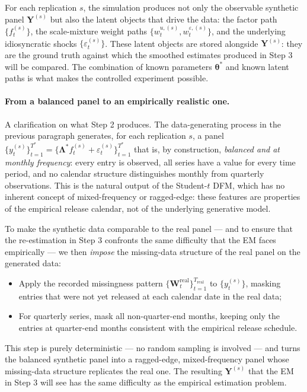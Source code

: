 \documentclass[11pt, a4paper, oneside]{article}
\newcommand{\mY}{\mathbf{Y}}
\newcommand{\mL}{\boldsymbol{\Lambda}}
\newcommand{\btheta}{\boldsymbol{\theta}}
\begin{document}
For each replication $s$, the simulation produces not only the
observable synthetic panel $\mY^{(s)}$ but also the latent objects
that drive the data: the factor path $\{f_t^{(s)}\}$, the
scale-mixture weight paths $\{w_t^{u,(s)}, w_t^{\varepsilon, (s)}\}$,
and the underlying idiosyncratic shocks
$\{\varepsilon_t^{(s)}\}$. These latent objects are stored alongside
$\mY^{(s)}$: they are the ground truth against which the smoothed
estimates produced in Step 3 will be compared. The combination of
known parameters $\btheta^*$ and known latent paths is what makes the
controlled experiment possible.

\paragraph{From a balanced panel to an empirically realistic one.}
A clarification on what Step 2 produces. The data-generating
process in the previous paragraph generates, for each replication
$s$, a panel
$\{y_t^{(s)}\}_{t=1}^{T^*} = \{\mL^* f_t^{(s)} + \varepsilon_t^{(s)}\}_{t=1}^{T^*}$
that is, by construction, \emph{balanced and at monthly frequency}:
every entry is observed, all series have a value for every time
period, and no calendar structure distinguishes monthly from
quarterly observations. This is the natural output of the
Student-$t$ DFM, which has no inherent concept of mixed-frequency
or ragged-edge: these features are properties of the empirical
release calendar, not of the underlying generative model.

To make the synthetic data comparable to the real panel — and to
ensure that the re-estimation in Step 3 confronts the same
difficulty that the EM faces empirically — we then \emph{impose}
the missing-data structure of the real panel on the generated data:
\begin{itemize}[leftmargin=1.5em, itemsep=3pt]
    \item Apply the recorded missingness pattern
          $\{\mathbf{W}_t^{\mathrm{real}}\}_{t=1}^{T_{\mathrm{real}}}$
          to $\{y_t^{(s)}\}$, masking entries that were not yet
          released at each calendar date in the real data;
    \item For quarterly series, mask all non-quarter-end months,
          keeping only the entries at quarter-end months consistent
          with the empirical release schedule.
\end{itemize}
This step is purely deterministic — no random sampling is involved
— and turns the balanced synthetic panel into a ragged-edge,
mixed-frequency panel whose missing-data structure replicates the
real one. The resulting $\mY^{(s)}$ that the EM in Step 3 will see
has the same difficulty as the empirical estimation problem.
\end{document}
